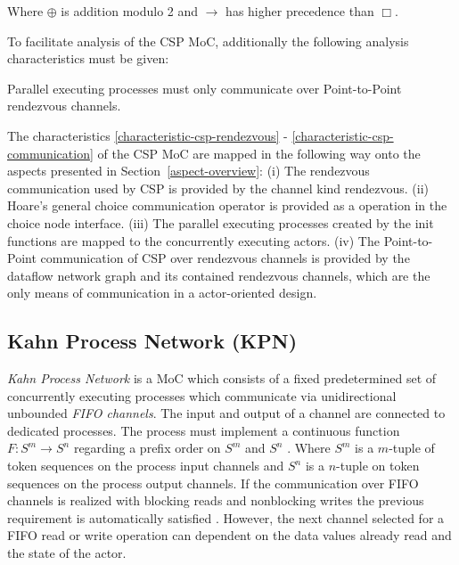 Where $\oplus$ is addition modulo 2 and $\to$ has higher precedence than $\Box$.

To facilitate analysis of the CSP MoC, additionally the following
analysis characteristics must be given:
\begin{characteristic}\label{characteristic-csp-communication}
  Parallel executing processes must only communicate over Point-to-Point rendezvous channels.
\end{characteristic}

The characteristics \ref{characteristic-csp-rendezvous} -
\ref{characteristic-csp-communication} of the CSP MoC are mapped in the following way
onto the aspects presented in Section~\ref{aspect-overview}:
(i) The rendezvous communication %
used by CSP is provided by the channel kind rendezvous. %
(ii) Hoare's general choice communication operator %
is provided as a operation in the choice node interface. %
(iii) The parallel executing processes %
created by the init functions are mapped to the concurrently executing actors.
(iv) The Point-to-Point communication of CSP over rendezvous channels %
is provided by the dataflow network graph %
and its contained rendezvous channels, which are the only means of communication in a
actor-oriented design.

\subsection{Kahn Process Network (KPN)}
\emph{Kahn Process Network} \cite{kahn:1974} is a MoC
which consists of a fixed predetermined set of
concurrently executing processes which communicate via unidirectional
unbounded \emph{FIFO channels}. The input and output of a channel
are connected to dedicated processes. The process must implement
a continuous function $F: S^m \to S^n$ regarding a prefix order on
$S^m$ and $S^n$ \cite{kahn:1974,stark87concurrent:1987}.
Where $S^m$ is a $m$-tuple of token sequences on the process input channels
and $S^n$ is a $n$-tuple on token sequences on the process output channels.
If the communication over FIFO channels is realized with blocking
reads and nonblocking writes the previous requirement is automatically
satisfied \cite{stark87concurrent:1987}. However, the next channel
selected for a FIFO read or write operation can dependent on
the data values already read and the state of the actor.

